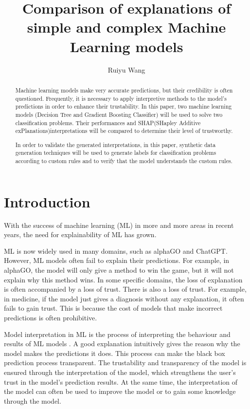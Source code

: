 \documentclass[runningheads,a4paper]{llncs}
\title{Comparison of explanations of simple and complex Machine Learning models}
\author{Ruiyu Wang}
\institute{MSc in Advanced Computer Science, \\ School of Computing Science,
        University of Newcastle, U. K. \\
        \email{r.wang57@ncl.ac.uk}
}
\begin{document}
\maketitle

\begin{abstract}
Machine learning models make very accurate predictions, but their credibility is often questioned. Frequently, it is necessary to apply interpretive methods to the model's predictions in order to enhance their trustability. In this paper, two machine learning models (Decision Tree and Gradient Boosting Classifier) will be used to solve two classification problems. Their performances and SHAP(SHapley Additive exPlanations)interpretations will be compared to determine their level of trustworthy. 

In order to validate the generated interpretations, in this paper, synthetic data generation techniques will be used to generate labels for classification problems according to custom rules and to verify that the model understands the custom rules.
\end{abstract}

\section{Introduction}

With the success of machine learning (ML) in more and more areas in recent years, the need for explainability of ML has grown.

ML is now widely used in many domains, such as alphaGO and ChatGPT.
However, ML models often fail to explain their predictions. For example,  in alphaGO, the model will only give a method to win the game, but it will not explain why this method wins.
In some specific domains, the loss of explanation is often accompanied by a loss of trust.
There is also a loss of trust. 
For example, in medicine, if the model just gives a diagnosis without any explanation, it often fails to gain trust. This is because the cost of models that make incorrect predictions is often prohibitive.

Model interpretation in ML is the process of interpreting the behaviour and results of ML models \cite{doshivelez2017rigorous}.
A good explanation intuitively gives the reason why the model makes the predictions it does.
This process can make the black box prediction process transparent.\cite{8466590}
The trustability and transparency of the model is ensured through the interpretation of the model\cite{arrieta2020explainable}\cite{Molnar2020}, which strengthens the user's trust in the model's prediction results.
At the same time, the interpretation of the model can often be used to improve the model or to gain some knowledge through the model.\cite{8466590}
\end{document}
